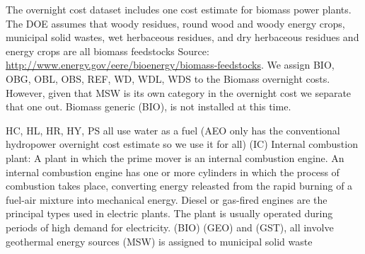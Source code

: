 \documentclass[10pt]{amsart}
\begin{document}
The overnight cost dataset includes one cost estimate for biomass power plants. 
The DOE assumes that woody residues, round wood and woody energy crops, municipal solid wastes, wet herbaceous residues, and dry herbaceous residues and energy 
crops are all biomass feedstocks Source: \url{http://www.energy.gov/eere/bioenergy/biomass-feedstocks}. 
We assign BIO, OBG, OBL, OBS, REF, WD, WDL, WDS to the Biomass overnight costs. However, given that MSW is its own category in the overnight cost we separate that one out.
 Biomass generic (BIO),  is not installed at this time.  
\begin{table}

\end{table}

HC, HL, HR, HY, PS all use water as a fuel (AEO only has the conventional hydropower overnight cost estimate so we use it for all)
(IC) Internal combustion plant: A plant in which the prime mover is an internal combustion engine. An internal combustion engine has one or more cylinders in which the process of combustion takes place, converting energy releasted from the rapid burning of a fuel-air mixture into mechanical energy. Diesel or gas-fired engines are the principal types used in electric plants. The plant is usually operated during periods of high demand for electricity.
(BIO) 
(GEO) and (GST), all involve geothermal energy sources
(MSW) is assigned to municipal solid waste
\end{document}
